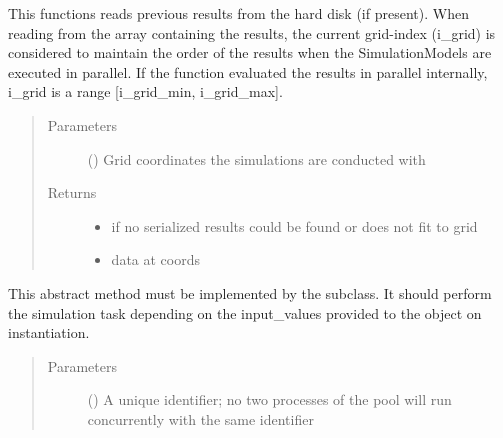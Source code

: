 \documentclass[letterpaper,10pt,english,openany,oneside]{sphinxmanual}
\begin{document}
\begin{fulllineitems}
\begin{fulllineitems}
\label{\detokenize{pygpc:pygpc.AbstractModel.AbstractModel.read_previous_results}}
This functions reads previous results from the hard disk (if present).
When reading from the array containing the results, the current
grid-index (i\_grid) is considered to maintain the order of the results when the
SimulationModels are executed in parallel. If the function evaluated the results in parallel
internally, i\_grid is a range {[}i\_grid\_min, i\_grid\_max{]}.
\begin{quote}\begin{description}
\item[{Parameters}] \leavevmode
{} (\sphinxstyleliteralemphasis{\sphinxupquote{ {[}}}\sphinxstyleliteralemphasis{\sphinxupquote{{]}}}) \textendash{} Grid coordinates the simulations are conducted with

\item[{Returns}] \leavevmode
\begin{itemize}
\item {} 
 \textendash{} if no serialized results could be found or does not fit to grid

\item {} 
 \textendash{} data at coords

\end{itemize}


\end{description}\end{quote}

\end{fulllineitems}


\begin{fulllineitems}
\label{\detokenize{pygpc:pygpc.AbstractModel.AbstractModel.simulate}}
This abstract method must be implemented by the subclass.
It should perform the simulation task depending on the input\_values provided to the object on instantiation.
\begin{quote}\begin{description}
\item[{Parameters}] \leavevmode
{} () \textendash{} A unique identifier; no two processes of the pool will run concurrently with the same identifier


\end{description}
\end{quote}
\end{fulllineitems}
\end{fulllineitems}
\end{document}
